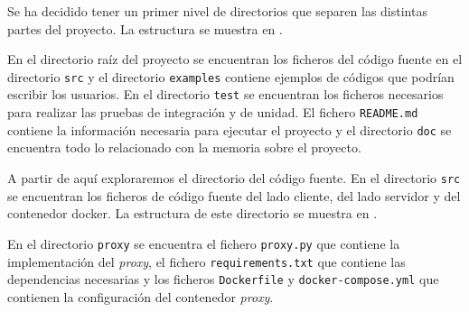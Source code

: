 Se ha decidido tener un primer nivel de directorios que separen las distintas partes del proyecto. La estructura se muestra en .   
\begin{figure}[H]
    {
    \begin{tcolorbox}
    \end{tcolorbox}
    }
\end{figure}
En el directorio raíz del proyecto se encuentran los ficheros del \gls{código fuente} en el directorio \texttt{src} y el directorio \texttt{examples} contiene ejemplos de códigos que podrían escribir los usuarios. En el directorio \texttt{test} se encuentran los ficheros necesarios para realizar las pruebas de integración y de unidad. El fichero \texttt{README.md} contiene la información necesaria para ejecutar el proyecto y el directorio \texttt{doc} se encuentra todo lo relacionado con la memoria sobre el proyecto.

A partir de aquí exploraremos el directorio del \gls{código fuente}. En el directorio \texttt{src} se encuentran los ficheros de \gls{código fuente} del lado cliente, del lado servidor y del \gls{contenedor} docker. La estructura de este directorio se muestra en .

\begin{figure}[htb]
    {
    \begin{tcolorbox}
    \end{tcolorbox}
    }
\end{figure}
En el directorio \texttt{proxy} se encuentra el fichero \texttt{proxy.py} que contiene la implementación del \textit{\gls{proxy}}, el fichero \texttt{requirements.txt} que contiene las dependencias necesarias y los ficheros \texttt{Dockerfile} y \texttt{docker-compose.yml} que contienen la configuración del \gls{contenedor} \textit{\gls{proxy}}.

